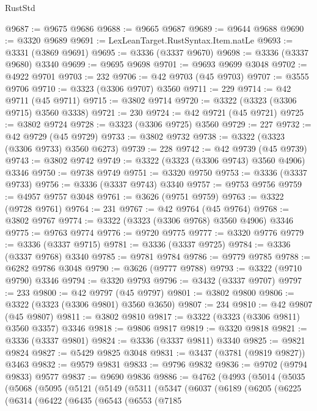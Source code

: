 \begin{lexlean}{RustStd}
\begin{coremodule}
@9687 := @9675 @9686
@9688 := @9665 @9687
@9689 := @9644 @9688
@9690 := @3320 @9689
@9691 := LexLeanTarget.RustSyntax.Item.natLe
@9693 := @3331 (@3869 @9691)
@9695 := @3336 (@3337 @9670)
@9698 := @3336 (@3337 @9680) @3340
@9699 := @9695 @9698
@9701 := @9693 @9699 @3048
@9702 := @4922 @9701
@9703 := 232
@9706 := @42 @9703 (@45 @9703)
@9707 := @3555 @9706
@9710 := @3323 (@3306 @9707) @3560
@9711 := 229
@9714 := @42 @9711 (@45 @9711)
@9715 := @3802 @9714
@9720 := @3322 (@3323 (@3306 @9715) @3560 @3338)
@9721 := 230
@9724 := @42 @9721 (@45 @9721)
@9725 := @3802 @9724
@9728 := @3323 (@3306 @9725) @3560
@9729 := 227
@9732 := @42 @9729 (@45 @9729)
@9733 := @3802 @9732
@9738 := @3322 (@3323 (@3306 @9733) @3560 @6273)
@9739 := 228
@9742 := @42 @9739 (@45 @9739)
@9743 := @3802 @9742
@9749 := @3322 (@3323 (@3306 @9743) @3560 @4906) @3346
@9750 := @9738 @9749
@9751 := @3320 @9750
@9753 := @3336 (@3337 @9733)
@9756 := @3336 (@3337 @9743) @3340
@9757 := @9753 @9756
@9759 := @4957 @9757 @3048
@9761 := @3626 (@9751 @9759)
@9763 := @3322 (@9728 @9761)
@9764 := 231
@9767 := @42 @9764 (@45 @9764)
@9768 := @3802 @9767
@9774 := @3322 (@3323 (@3306 @9768) @3560 @4906) @3346
@9775 := @9763 @9774
@9776 := @9720 @9775
@9777 := @3320 @9776
@9779 := @3336 (@3337 @9715)
@9781 := @3336 (@3337 @9725)
@9784 := @3336 (@3337 @9768) @3340
@9785 := @9781 @9784
@9786 := @9779 @9785
@9788 := @6282 @9786 @3048
@9790 := @3626 (@9777 @9788)
@9793 := @3322 (@9710 @9790) @3346
@9794 := @3320 @9793
@9796 := @3432 (@3337 @9707)
@9797 := 233
@9800 := @42 @9797 (@45 @9797)
@9801 := @3802 @9800
@9806 := @3322 (@3323 (@3306 @9801) @3560 @3650)
@9807 := 234
@9810 := @42 @9807 (@45 @9807)
@9811 := @3802 @9810
@9817 := @3322 (@3323 (@3306 @9811) @3560 @3357) @3346
@9818 := @9806 @9817
@9819 := @3320 @9818
@9821 := @3336 (@3337 @9801)
@9824 := @3336 (@3337 @9811) @3340
@9825 := @9821 @9824
@9827 := @5429 @9825 @3048
@9831 := @3437 (@3781 (@9819 @9827)) @3463
@9832 := @9579 @9831
@9833 := @9796 @9832
@9836 := @9702 (@9794 @9833) @9577
@9837 := @9690 @9836
@9886 := @4762
    (@4993
      (@5014
        (@5035
          (@5068
            (@5095
              (@5121
                (@5149
                  (@5311
                    (@5347
                      (@6037
                        (@6189
                          (@6205
                            (@6225
                              (@6314
                                (@6422
                                  (@6435
                                    (@6543
                                      (@6553
                                        (@7185

\end{coremodule}
\end{lexlean}

